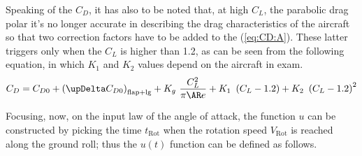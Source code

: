 \bigskip
\noindent
Speaking of the $C_D$, it has also to be noted that, at high $C_L$, the parabolic drag polar it's no longer accurate in describing the drag characteristics of the aircraft so that two correction factors have to be added to the (\ref{eq:CD:A}). These latter triggers only when the $C_L$ is higher than 1.2, as can be seen from the following equation, in which $K_1$ and $K_2$ values depend on the aircraft in exam.
%
\begin{equation}
C_D = C_{D0} + \left(\upDelta C_{D0}\right)_{\text{flap}+\text{lg}} +  K_g\ \frac{C_L^2}{\pi \AR e} + K_1\ \left(C_L-1.2\right) + K_2\ \left(C_L-1.2\right)^2
\end{equation}

\bigskip
\noindent
Focusing, now, on the input law of the angle of attack, the function $u$ can be constructed by picking the time $t_{\text{Rot}}$ when the rotation speed $V_{\text{Rot}}$ is reached along the ground roll; thus the $u (t)$ function can be defined as follows.


